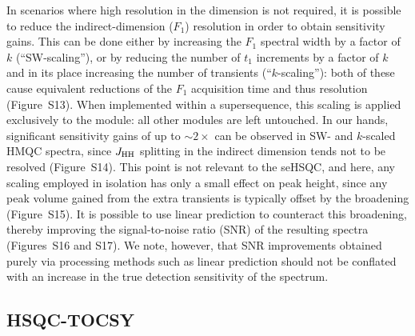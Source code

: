\documentclass[final,twocolumn]{elsarticle}
\newcommand*{\nitrogen}{\ce{^{15}N}}
\newcommand*{\jhh}{J_{\ce{HH}}}
\begin{document}
In scenarios where high resolution in the \nitrogen{} dimension is not required, it is possible to reduce the indirect-dimension ($F_1$) resolution in order to obtain sensitivity gains.
This can be done either by increasing the $F_1$ spectral width by a factor of $k$ (``SW-scaling''), or by reducing the number of $t_1$ increments by a factor of $k$ and in its place increasing the number of transients (``$k$-scaling'')\cite{Perez-Trujillo2007MRC, Parella2010CMR}: both of these cause equivalent reductions of the $F_1$ acquisition time and thus resolution (Figure~S13).
When implemented within a supersequence, this scaling is applied exclusively to the \nitrogen{} module: all other modules are left untouched.
In our hands, significant sensitivity gains of up to $\sim 2\times$ can be observed in SW- and $k$-scaled \nitrogen{} HMQC spectra, since $\jhh$ splitting in the indirect dimension tends not to be resolved (Figure~S14).
This point is not relevant to the seHSQC, and here, any scaling employed in isolation has only a small effect on peak height, since any peak volume gained from the extra transients is typically offset by the broadening (Figure~S15).
It is possible to use linear prediction\cite{Tufts1982IEEETASSP, Led1991CR, Koehl1999PNMRS} to counteract this broadening, thereby improving the signal-to-noise ratio (SNR) of the resulting spectra (Figures~S16 and S17).
We note, however, that SNR improvements obtained purely via processing methods such as linear prediction should not be conflated with an increase in the true detection sensitivity of the spectrum.\cite{Donoho1990PNASUSA, Stern2002JACS, Palmer2015JPCB}

\subsection{HSQC-TOCSY}
\end{document}
